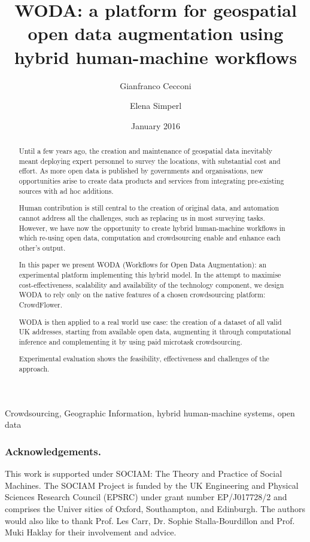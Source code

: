 \documentclass{llncs}
\title{WODA: a platform for geospatial open data augmentation using hybrid human-machine workflows}
\author{Gianfranco Cecconi\inst{1} \and Elena Simperl\inst{1}}
\institute{University of Southampton \email{gc1a13@soton.ac.uk}}
\date{January 2016}
\begin{document}
\maketitle

\begin{abstract}
Until a few years ago, the creation and maintenance of geospatial data inevitably meant deploying expert personnel to survey the locations, with substantial cost and effort. As more open data is published by governments and organisations, new opportunities arise to create data products and services from integrating pre-existing sources with ad hoc additions.

Human contribution is still central to the creation of original data, and automation cannot address all the challenges, such as replacing us in most surveying tasks. However, we have now the opportunity to create hybrid human-machine workflows in which re-using open data, computation and crowdsourcing enable and enhance each other's output. 

In this paper we present WODA (Workflows for Open Data Augmentation): an experimental platform implementing this hybrid model. In the attempt to maximise cost-effectiveness, scalability and availability of the technology component, we design WODA to rely only on the native features of a chosen crowdsourcing platform: CrowdFlower. 

WODA is then applied to a real world use case: the creation of a dataset of all valid UK addresses, starting from available open data, augmenting it through computational inference and complementing it by using paid microtask crowdsourcing. 

Experimental evaluation shows the feasibility, effectiveness and challenges of the approach.
\end{abstract}

\begin{keywords}
Crowdsourcing, Geographic Information, hybrid human-machine systems, open data 
\end{keywords}









\subsubsection{Acknowledgements.} This work is supported under SOCIAM: The Theory and Practice of Social Machines. The SOCIAM Project is funded by the UK Engineering and Physical Sciences Research Council (EPSRC) under grant number EP/J017728/2 and comprises the Univer sities of Oxford, Southampton, and Edinburgh. The authors would also like to thank Prof. Les Carr, Dr. Sophie Stalla-Bourdillon and Prof. Muki Haklay for their involvement and advice. 


\end{document}
